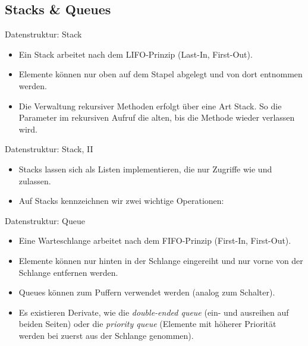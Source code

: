 \subsection{Stacks \& Queues}

\begin{frame}{Datenstruktur: Stack}
    \hypertarget<1>{mrk:Stack}{}%
    \begin{itemize}[<+(1)->]
        \widei
        \item Ein Stack arbeitet nach dem LIFO-Prinzip (Last-In, First-Out).
        \item Elemente können nur oben auf dem Stapel abgelegt und von dort entnommen werden.
        \item Die Verwaltung rekursiver Methoden erfolgt über eine Art Stack. So  die Parameter im rekursiven Aufruf die alten, bis die Methode wieder verlassen wird.
    \end{itemize}
\end{frame}

\begin{frame}{Datenstruktur: Stack, II}
    \begin{itemize}[<+(1)->]
        \widei
        \item Stacks lassen sich als Listen implementieren,\pause{} die nur Zugriffe wie  und  zulassen.
        \item Auf Stacks kennzeichnen wir zwei wichtige Operationen: 
    \end{itemize}
\end{frame}

\begin{frame}{Datenstruktur: Queue}
    \hypertarget<1>{mrk:Queue}{}\begin{itemize}[<+(1)->]
        \widei
        \item Eine Warteschlange arbeitet nach dem FIFO-Prinzip (First-In, First-Out).
        \item Elemente können nur hinten in der Schlange eingereiht und nur vorne von der Schlange entfernen werden.
        \item Queues können zum Puffern verwendet werden (analog zum Schalter).
        \item Es existieren Derivate, wie die \emph{double-ended queue} (ein- und ausreihen auf beiden Seiten) oder die \emph{priority queue} (Elemente mit höherer Priorität werden bei  zuerst aus der Schlange genommen).
    \end{itemize}
\end{frame}

